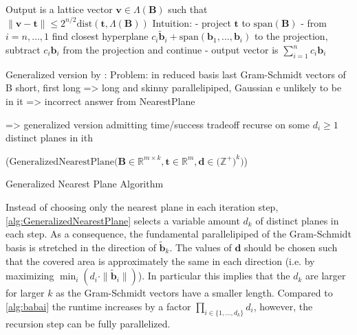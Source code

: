 Output is a lattice vector $\textbf{v} \in \Lambda(\textbf{B})$ such that $\|\textbf{v} - \textbf{t}\| \leq 2^{n/2} \text{dist}(\textbf{t}, \Lambda(\textbf{B}))$ %
Intuition:
 - project $\textbf{t}$ to $\text{span}(\textbf{B})$
 - from $i=n, \dots, 1$ find closest hyperplane $c_i \tilde{\textbf{b}}_i + \text{span}(\textbf{b}_1, \dots, \textbf{b}_i)$ to the projection, subtract $c_i \textbf{b}_i$ from the projection and continue %
 - output vector is $\sum_{i=1}^n c_i \textbf{b}_i$


Generalized version by \cite{LP11}:
Problem: in reduced basis last Gram-Schmidt vectors of B short, first long => long and skinny parallelipiped, Gaussian e unlikely to be in it => incorrect answer from NearestPlane

=> generalized version admitting time/success tradeoff
recurse on some $d_i \geq 1$ distinct planes in ith 

\begin{algorithm2e}
  \Begin($\text{GeneralizedNearestPlane} {(} \textbf{B} \in \mathbb{R}^{m \times k},\textbf{t} \in \mathbb{R}^{m}, \textbf{d} \in {(}\mathbb{Z}^+{)}^k {)}$) 
  { %
  }
\caption{Generalized Nearest Plane Algorithm \cite{LP11}}\label{alg:GeneralizedNearestPlane}
\end{algorithm2e}
Instead of choosing only the nearest plane in each iteration step, \cref{alg:GeneralizedNearestPlane} selects a variable amount $d_k$ of distinct planes in each step. As a consequence, the fundamental parallelipiped of the Gram-Schmidt basis is stretched in the direction of $\tilde{\textbf{b}}_k$. The values of $\textbf{d}$ should be chosen such that the covered area is approximately the same in each direction (i.e. by maximizing $\min_i(d_i \cdot \|\tilde{\textbf{b}}_i\|)$). In particular this implies that the $d_k$ are larger for larger $k$ as the Gram-Schmidt vectors have a smaller length. %
Compared to \cref{alg:babai} the runtime increases by a factor $\prod_{i \in \{1, \dots, d_k\}} d_i$, however, the recursion step can be fully parallelized.

